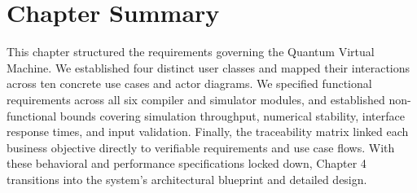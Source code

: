 \section{Chapter Summary}
This chapter structured the requirements governing the Quantum Virtual Machine. We established four distinct user classes and mapped their interactions across ten concrete use cases and actor diagrams. We specified functional requirements across all six compiler and simulator modules, and established non-functional bounds covering simulation throughput, numerical stability, interface response times, and input validation. Finally, the traceability matrix linked each business objective directly to verifiable requirements and use case flows. With these behavioral and performance specifications locked down, Chapter 4 transitions into the system's architectural blueprint and detailed design.
